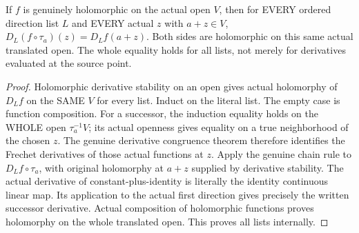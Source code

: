 \begin{theorem}
\label{hir:relative-normal-translated-taylor-whole-derivative-identity}
\leanok
{}
If $f$ is genuinely holomorphic on the actual open $V$, then for EVERY
ordered direction list $L$ and EVERY actual $z$ with $a+z\in V$,
$D_L(f\circ\tau_a)(z)=D_Lf(a+z)$. Both sides are holomorphic on this
same actual translated open. The whole equality holds for all lists, not
merely for derivatives evaluated at the source point.
\end{theorem}
\begin{proof}
Holomorphic derivative stability on an open gives actual holomorphy of
$D_Lf$ on the SAME $V$ for every list. Induct on the literal list. The empty
case is function composition. For a successor, the induction equality holds
on the WHOLE open $\tau_a^{-1}V$; its actual openness gives equality on a true
neighborhood of the chosen $z$. The genuine derivative congruence theorem
therefore identifies the Frechet derivatives of those actual functions at
$z$. Apply the genuine chain rule to $D_Lf\circ\tau_a$, with original
holomorphy at $a+z$ supplied by derivative stability. The actual derivative
of constant-plus-identity is literally the identity continuous linear map.
Its application to the actual first direction gives precisely the written
successor derivative. Actual composition of holomorphic functions proves
holomorphy on the whole translated open. This proves all lists internally.
\end{proof}

